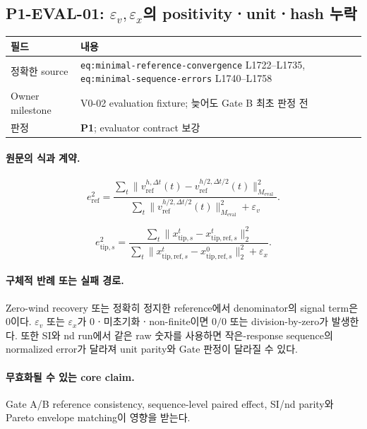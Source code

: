 \documentclass[11pt]{article}
\newcommand{\src}[1]{\textcolor{CoreBlue}{\nolinkurl{#1}}}
\newcommand{\pone}{\textcolor{WarnOrange}{\textbf{P1}}}
\begin{document}
\subsection{P1-EVAL-01: $\varepsilon_v,\varepsilon_x$의 positivityㆍunitㆍhash 누락}

\begin{tabularx}{\textwidth}{L{0.22\textwidth}Y}
\toprule
필드 & 내용 \\
\midrule
정확한 source & \src{eq:minimal-reference-convergence} L1722--L1735, \src{eq:minimal-sequence-errors} L1740--L1758 \\
Owner milestone & V0-02 evaluation fixture; 늦어도 Gate B 최초 판정 전 \\
판정 & \pone; evaluator contract 보강 \\
\bottomrule
\end{tabularx}

\paragraph{원문의 식과 계약.}
\begin{equation}
  e_{\mathrm{ref}}^2
  =
  \frac{
  \sum_t\|v_{\mathrm{ref}}^{h,\Delta t}(t)-
  v_{\mathrm{ref}}^{h/2,\Delta t/2}(t)\|_{M_{\mathrm{eval}}}^2
  }{
  \sum_t\|v_{\mathrm{ref}}^{h/2,\Delta t/2}(t)\|_{M_{\mathrm{eval}}}^2
  +\varepsilon_v
  }.
\end{equation}

\begin{equation}
  e_{\mathrm{tip},s}^2
  =
  \frac{
  \sum_t\|x_{\mathrm{tip},s}^t-x_{\mathrm{tip,ref},s}^t\|_2^2
  }{
  \sum_t\|x_{\mathrm{tip,ref},s}^t-x_{\mathrm{tip,ref},s}^0\|_2^2
  +\varepsilon_x
  }.
\end{equation}

\paragraph{구체적 반례 또는 실패 경로.}
Zero-wind recovery 또는 정확히 정지한 reference에서 denominator의 signal term은 0이다.
$\varepsilon_v$ 또는 $\varepsilon_x$가 0ㆍ미초기화ㆍnon-finite이면 $0/0$ 또는 division-by-zero가 발생한다.
또한 SI와 nd run에서 같은 raw 숫자를 사용하면 작은-response sequence의 normalized error가 달라져
unit parity와 Gate 판정이 달라질 수 있다.

\paragraph{무효화될 수 있는 core claim.}
Gate A/B reference consistency, sequence-level paired effect, SI/nd parity와
Pareto envelope matching이 영향을 받는다.
\end{document}
